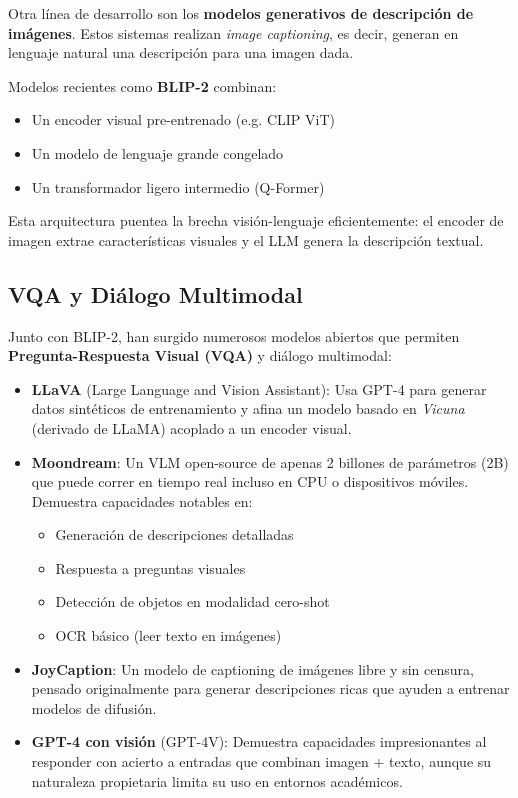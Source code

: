 Otra línea de desarrollo son los \textbf{modelos generativos de descripción de imágenes}. Estos sistemas realizan \emph{image captioning}, es decir, generan en lenguaje natural una descripción para una imagen dada.

Modelos recientes como \textbf{BLIP-2} combinan:
\begin{itemize}
  \item Un encoder visual pre-entrenado (e.g. CLIP ViT)
  \item Un modelo de lenguaje grande congelado
  \item Un transformador ligero intermedio (Q-Former)
\end{itemize}

Esta arquitectura puentea la brecha visión-lenguaje eficientemente: el encoder de imagen extrae características visuales y el LLM genera la descripción textual.

\subsection{VQA y Diálogo Multimodal}

Junto con BLIP-2, han surgido numerosos modelos abiertos que permiten \textbf{Pregunta-Respuesta Visual (VQA)} y diálogo multimodal:

\begin{itemize}
  \item \textbf{LLaVA} (Large Language and Vision Assistant): Usa GPT-4 para generar datos sintéticos de entrenamiento y afina un modelo basado en \emph{Vicuna} (derivado de LLaMA) acoplado a un encoder visual.
  
  \item \textbf{Moondream}: Un VLM open-source de apenas 2 billones de parámetros (2B) que puede correr en tiempo real incluso en CPU o dispositivos móviles. Demuestra capacidades notables en:
  \begin{itemize}
    \item Generación de descripciones detalladas
    \item Respuesta a preguntas visuales
    \item Detección de objetos en modalidad cero-shot
    \item OCR básico (leer texto en imágenes)
  \end{itemize}
  
  \item \textbf{JoyCaption}: Un modelo de captioning de imágenes libre y sin censura, pensado originalmente para generar descripciones ricas que ayuden a entrenar modelos de difusión.
  
  \item \textbf{GPT-4 con visión} (GPT-4V): Demuestra capacidades impresionantes al responder con acierto a entradas que combinan imagen + texto, aunque su naturaleza propietaria limita su uso en entornos académicos.
\end{itemize}

